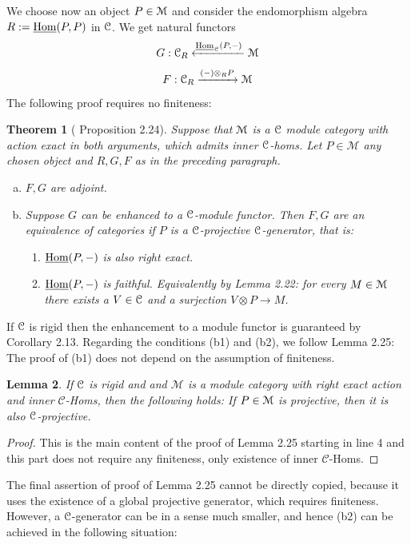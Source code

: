 \documentclass[a4paper, reqno]{amsart}
\newtheorem{theorem}{Theorem}[section]
\newtheorem{lemma}[theorem]{Lemma}
\theoremstyle{introTheorems}
\newcommand\cC{\mathcal{C}}
\newcommand\cM{\mathcal{M}}
\newcommand\Hom{\textup{Hom}}
\renewcommand{\1}{\mathbbold{1}}
\begin{document}
We choose now an object $P\in\mathcal{M}$ and consider the endomorphism algebra $R:=\underline{\Hom}(P,P)$ in $\mathcal{C}$. We get  natural functors
$$G:\catC_R
\xleftarrow{\underline{\Hom}_\catC(P,-)}\catM$$
$$F:\mathcal{C}_R\xrightarrow{(-)\otimes_R P}
\mathcal{M}$$
The following proof requires no finiteness:

\begin{theorem}[\cite{DSPS19} Proposition 2.24]\label{thm:DSPS}
Suppose that $\mathcal{M}$ is a $\mathcal{C}$ module category with action exact in both arguments, which admits inner $\mathcal{C}$-homs. Let $P\in\cM$ any chosen object and $R,G,F$ as in the preceding paragraph.
\begin{enumerate}[(a)]
\item $F,G$ are adjoint.
\item Suppose $G$ can be enhanced to a $\mathcal{C}$-module functor. Then $F,G$ are an equivalence of categories if $P$ is a $\mathcal{C}$-projective $\mathcal{C}$-generator, that is:
\begin{enumerate}
    \item[(b1)] $\underline{\Hom}(P,-)$ is also right exact.
\item[(b2)] $\underline{\Hom}(P,-)$ is faithful. Equivalently by \cite{DSPS19} Lemma 2.22: for every $M\in\mathcal{M}$ there exists a $V\in \mathcal{C}$ and a surjection $V\otimes P\to M$.


\end{enumerate}
\end{enumerate}
\end{theorem}

If $\mathcal{C}$ is rigid then the enhancement to a module functor is guaranteed by \cite{DSPS19}  Corollary 2.13. Regarding the conditions (b1) and (b2), we follow \cite{DSPS19} Lemma 2.25: The proof of (b1) does not depend on the assumption of finiteness.
\begin{lemma}\label{lm:DSPSprojective}
If $\mathcal{C}$ is rigid and and $\cM$ is a module category with right exact action and inner $\cC$-Homs, then the following holds: If $P\in \mathcal{M}$ is projective, then it is also $\mathcal{C}$-projective. 
\end{lemma}
\begin{proof}
    This is the main content of the proof of  \cite{DSPS19} Lemma 2.25 starting in line 4 and this part does not require any finiteness, only existence of inner $\cC$-Homs.
\end{proof}
The final assertion of proof of \cite{DSPS19} Lemma 2.25 cannot be directly copied, because it uses the existence of a global projective generator, which requires finiteness. However, a $\mathcal{C}$-generator can be in a sense much smaller, and hence (b2) can be achieved in the following situation:
\end{document}
